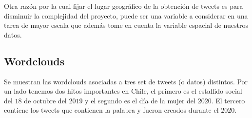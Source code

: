 \documentclass{article}
\begin{document}
\begin{remark}
	Otra razón por la cual fijar el lugar geográfico de la obtención de tweets es para disminuir la complejidad del proyecto, puede ser una variable a considerar en una tarea de mayor escala que además tome en cuenta la variable espacial de nuestros datos.	
\end{remark}

\subsection{Wordclouds}
	Se muestran las wordclouds asociadas a tres set de tweets (o datos) distintos. Por un lado tenemos dos hitos importantes en Chile, el primero es el estallido social del $18$ de octubre del $2019$ y el segundo es el día de la mujer del $2020$. El tercero contiene los tweets que contienen la palabra  y fueron creados durante el $2020$.
	
	
	
\end{document}
